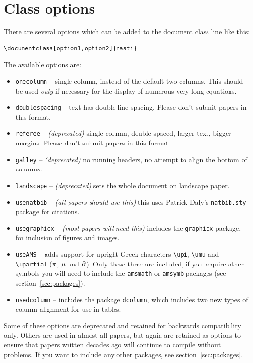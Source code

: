 \documentclass[fleqn,usenatbib,useAMS]{rasti}
\begin{document}
\section{Class options}
\label{sec:options}
There are several options which can be added to the document class line like this:

\begin{verbatim}
\documentclass[option1,option2]{rasti}
\end{verbatim}
The available options are:
\begin{itemize}
\item \verb'onecolumn' -- single column, instead of the default two columns. This should be used {\it only} if necessary for the display of numerous very long equations.
\item \verb'doublespacing' -- text has double line spacing. Please don't submit papers in this format.
\item \verb'referee' -- \textit{(deprecated)} single column, double spaced, larger text, bigger margins. Please don't submit papers in this format.
\item \verb'galley' -- \textit{(deprecated)} no running headers, no attempt to align the bottom of columns.
\item \verb'landscape' -- \textit{(deprecated)} sets the whole document on landscape paper.
\item \verb"usenatbib" -- \textit{(all papers should use this)} this uses Patrick Daly's \verb"natbib.sty" package for citations.
\item \verb"usegraphicx" -- \textit{(most papers will need this)} includes the \verb'graphicx' package, for inclusion of figures and images.
\item \verb'useAMS' -- adds support for upright Greek characters \verb'\upi', \verb'\umu' and \verb'\upartial' ($\pi$, $\mu$ and $\partial$). Only these three are included, if you require other symbols you will need to include the \verb'amsmath' or \verb'amsymb' packages (see section~\ref{sec:packages}).
\item \verb"usedcolumn" -- includes the package \verb"dcolumn", which includes two new types of column alignment for use in tables.
\end{itemize}

Some of these options are deprecated and retained for backwards compatibility only.
Others are used in almost all papers, but again are retained as options to ensure that papers written decades ago will continue to compile without problems.
If you want to include any other packages, see section~\ref{sec:packages}.
\end{document}
